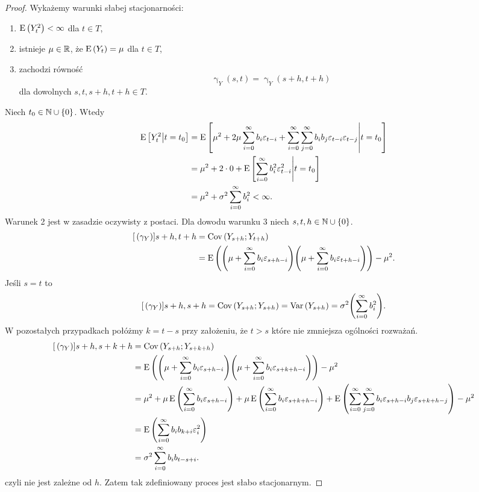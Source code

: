 \documentclass[10pt,a4paper]{book}
\newcommand{\tsAutoCovariance}[3][\gamma]{\operatorname{#1}_{#2} \left({#3}\right)}
\begin{document}
\begin{proof}
Wykażemy warunki słabej stacjonarności:
\begin{enumerate}
\item $ \operatorname{E} \left({Y_t^2} \right) < \infty$ dla $t \in T$,
\item istnieje $\mu \in \mathbb{R}$, że $ \operatorname{E} \left({Y_t} \right) = \mu $ dla $t \in T$,
\item zachodzi równość
$$
\tsAutoCovariance{Y}{s,t} = \tsAutoCovariance{Y}{s+h,t+h} 
$$
dla dowolnych $s,t,s+h,t+h \in T$.
\end{enumerate}
Niech $ t_0 \in \mathbb{N} \cup \left\lbrace {0} \right\rbrace$. Wtedy
\begin{align*}
\ExConditional{Y_t^2}{t=t_0} &= \ExConditional{\mu^2 + 2 \mu \sum_{i=0}^{\infty} b_i \epsilon_{t-i} + \sum_{i=0}^{\infty} \sum_{j=0}^{\infty} b_i b_j \epsilon_{t-i} \epsilon_{t-j} }{t=t_0}  \\
& = \mu^2 + 2 \cdot 0 + \ExConditional{\sum_{i=0}^{\infty} b_i^2 \epsilon_{t-i}^2 }{t=t_0} \\
& = \mu^2 + \sigma^2 \sum_{i=0}^{\infty} b_i^2 < \infty.
\end{align*}
Warunek 2 jest w zasadzie oczywisty z postaci. Dla dowodu warunku 3 niech $s,t,h \in \mathbb{N} \cup \left\lbrace {0} \right\rbrace$.
\begin{align*}
\function[{\gamma_Y}]{s+h,t+h} &= \Covariance{Y_{s+h}}{Y_{t+h}} \\
&= \Ex{ \bracket{\mu + \sum_{i=0}^{\infty} b_i \epsilon_{s+h-i}} \bracket{\mu + \sum_{i=0}^{\infty} b_i \epsilon_{t+h-i}}} - \mu^2.
\end{align*}
Jeśli $s=t$ to 
$$
\function[{\gamma_Y}]{s+h,s+h} = \Covariance{Y_{s+h}}{Y_{s+h}} = \Variance{Y_{s+h}} = \sigma^2 \bracket{ \sum_{i=0}^{\infty} b_i^2}.
$$
W pozostałych przypadkach połóżmy $k=t-s$ przy założeniu, że $t > s$ które nie zmniejsza ogólności rozważań.
\begin{align*}
\function[{\gamma_Y}]{s+h,s+k+h} &= \Covariance{Y_{s+h}}{Y_{s+k+h}} \\
&= \Ex{ \bracket{\mu + \sum_{i=0}^{\infty} b_i \epsilon_{s+h-i}} \bracket{\mu + \sum_{i=0}^{\infty} b_i \epsilon_{s+k+h-i}}} - \mu^2 \\
& = \mu^2 + \mu \Ex{\sum_{i=0}^{\infty} b_i \epsilon_{s+h-i}} + \mu \Ex{\sum_{i=0}^{\infty} b_i \epsilon_{s+k+h-i}} + \Ex{\sum_{i=0}^{\infty} \sum_{j=0}^{\infty}  b_i \epsilon_{s+h-i} b_j \epsilon_{s+k+h-j}} - \mu^2 \\
&= \Ex{\sum_{i=0}^{\infty} b_i b_{k+i} \epsilon_i^2} \\
& =\sigma^2 \sum_{i=0}^{\infty} b_{i} b_{t-s+i}.
\end{align*}
czyli nie jest zależne od $h$. Zatem tak zdefiniowany proces jest słabo stacjonarnym.
\end{proof}
\end{document}
